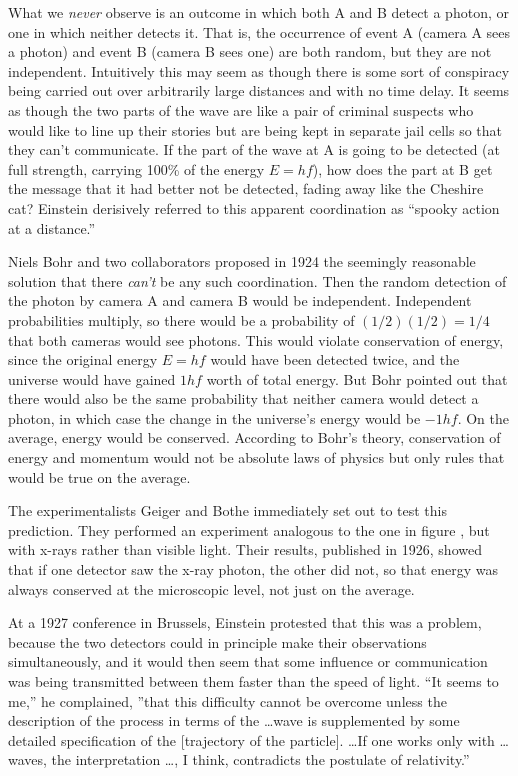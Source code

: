 What we \emph{never} observe is an outcome in which both A and B detect
a photon, or one in which neither detects it. That is, the occurrence
of event A (camera A sees a photon) and event B (camera B sees one)
are both random, but they are not independent. Intuitively this may
seem as though there is some sort of conspiracy being carried out
over arbitrarily large distances and with no time delay. It
seems as though the two parts of the wave are like a pair of
criminal suspects who would like to line up their stories but are
being kept in separate jail cells so that they can't communicate.  If
the part of the wave at A is going to be detected (at full strength,
carrying 100\% of the energy $E=hf$), how does the part
at B get the message that it had better not be detected, fading away
like the Cheshire cat? Einstein derisively referred to this apparent coordination
as ``spooky action at a distance.''

Niels Bohr and two collaborators proposed in 1924 the
seemingly reasonable solution that there \emph{can't} be any such
coordination. Then the random detection of the photon by camera A
and camera B would be independent. Independent probabilities multiply,
so there would be a probability of $(1/2)(1/2)=1/4$ that both cameras
would see photons. This would violate conservation of energy, since
the original energy $E=hf$ would have been detected twice, and the universe
would have gained $1hf$ worth of total energy. But Bohr
pointed out that there would also be the same probability that neither
camera would detect a photon, in which case the change in the universe's
energy would be $-1hf$. On the average, energy would be conserved. According
to Bohr's theory, conservation of energy and momentum would not be absolute
laws of physics but only rules that would be true on the average.

The experimentalists Geiger and Bothe immediately set out to test this
prediction. They performed an experiment analogous to the one in
figure , but with x-rays rather than visible
light.  Their results, published in 1926, showed that if one detector
saw the x-ray photon, the other did not, so that energy was always
conserved at the microscopic level, not just on the average.

At a 1927 conference in Brussels, Einstein protested that this was a
problem, because the two detectors could in principle make their
observations simultaneously, and it would then seem that some
influence or communication was being transmitted between them faster
than the speed of light.  ``It seems to me,'' he complained, ''that
this difficulty cannot be overcome unless the description of the
process in terms of the \ldots wave is supplemented by some detailed
specification of the [trajectory of the particle]. \ldots If one works
only with \ldots waves, the interpretation \ldots, I think,
contradicts the postulate of relativity.''

